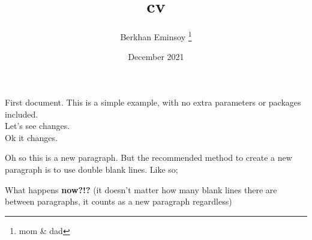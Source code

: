 \documentclass[letterpaper, 10pt]{article} %
\title{cv}
\author{Berkhan Eminsoy \thanks{mom \& dad}}
\date{December 2021}
\begin{document}
\maketitle

First document. This is a simple example, with no 
extra parameters or packages included.
\\ Let's see changes.
\\ Ok it changes.

\noindent Oh so this is a new paragraph. But the recommended method to create a new paragraph is to use double blank lines. Like so;

What happens \textbf{now?!?} (it doesn't matter how many blank lines there are between paragraphs, it counts as a new paragraph regardless)


\setlength{\tabcolsep}{8pt}
\end{document}
